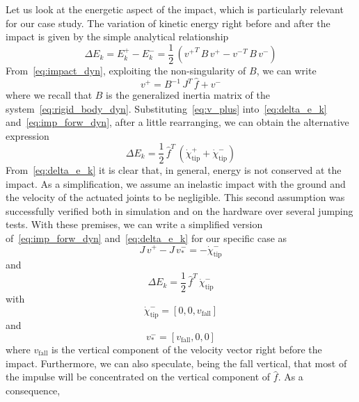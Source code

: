 Let us look at the energetic aspect of the impact, which is particularly relevant for our case study. The variation of kinetic energy right before and after the impact is given by the simple analytical relationship
\begin{dmath}\label{eq:delta_e_k}
    \Delta E_k = E_k^{+} - E_k^{-} = \dfrac{1}{2}\,\left({v^{+}}^T\,B\,v^{+} - {v^{-}}^T\,B\,v^{-}\right)
\end{dmath}
From~\eqref{eq:impact_dyn}, exploiting the non-singularity of $B$, we can write
\begin{equation}\label{eq:v_plus}
v^+ = B^{-1}\,J^T\,\hat{f} + v^{-}
\end{equation}
where we recall that $B$ is the generalized inertia matrix of the system~\eqref{eq:rigid_body_dyn}.
Substituting~\eqref{eq:v_plus} into~\eqref{eq:delta_e_k} and~\eqref{eq:imp_forw_dyn}, after a little rearranging, we can obtain the alternative expression
\begin{dmath}\label{eq:delta_e_k_altern}
    \Delta E_k = \dfrac{1}{2}\,\hat{f}^T\,\left(\dot{\chi}_{\mathrm{tip}}^{+} + \dot{\chi}_{\mathrm{tip}}^{-}\right)
\end{dmath}
From~\eqref{eq:delta_e_k} it is clear that, in general, energy is not conserved at the impact. As a simplification, we assume an inelastic impact with the ground and the velocity of the actuated joints to be negligible. This second assumption was successfully verified both in simulation and on the hardware over several jumping tests. With these premises, we can write a simplified version of~\eqref{eq:imp_forw_dyn} and~\eqref{eq:delta_e_k} for our specific case as
\begin{dmath}\label{eq:imp_forw_dyn_simpl}
    J\, v^{+} - J\, v^{-}_{*} = - \dot{\chi}_{\mathrm{tip}}^{-}
\end{dmath}
and 
\begin{dmath}\label{eq:delta_e_k_simpl}
    \Delta E_k = \dfrac{1}{2}\,\hat{f}^T\, \dot{\chi}_{\mathrm{tip}}^{-}
\end{dmath}
with 
\begin{equation} \label{eq:chi_dot_simpl}
    \dot{\chi}_{\mathrm{tip}}^{-} = \left[0, 0, 
v_{\mathrm{fall}}\right]
\end{equation}
and 
\begin{equation} \label{eq:v_m_star}
    v^{-}_{*} = \left[v_{\mathrm{fall}}, 0, 0\right]
\end{equation}
where $v_{\mathrm{fall}}$ is the vertical component of the velocity vector right before the impact.
Furthermore, we can also speculate, being the fall vertical, that most of the impulse will be concentrated on the vertical component of $\hat{f}$. As a consequence, 

